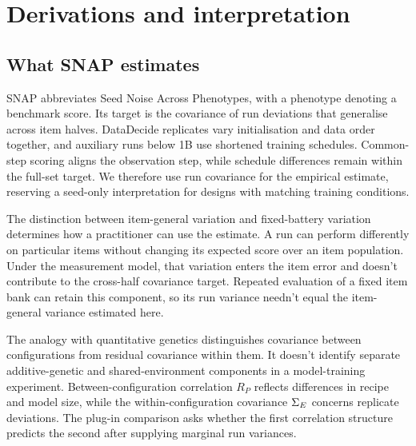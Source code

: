 \section{Derivations and interpretation}
\label{app:derivations}
\subsection{What SNAP estimates}
SNAP abbreviates Seed Noise Across Phenotypes, with a phenotype denoting a benchmark score. Its target is the covariance of run deviations that generalise across item halves. DataDecide replicates vary initialisation and data order together, and auxiliary runs below 1B use shortened training schedules. Common-step scoring aligns the observation step, while schedule differences remain within the full-set target. We therefore use run covariance for the empirical estimate, reserving a seed-only interpretation for designs with matching training conditions.

The distinction between item-general variation and fixed-battery variation determines how a practitioner can use the estimate. A run can perform differently on particular items without changing its expected score over an item population. Under the measurement model, that variation enters the item error and doesn't contribute to the cross-half covariance target. Repeated evaluation of a fixed item bank can retain this component, so its run variance needn't equal the item-general variance estimated here.

The analogy with quantitative genetics distinguishes covariance between configurations from residual covariance within them. It doesn't identify separate additive-genetic and shared-environment components in a model-training experiment. Between-configuration correlation $R_P$ reflects differences in recipe and model size, while the within-configuration covariance $\Sigma_E$ concerns replicate deviations. The plug-in comparison asks whether the first correlation structure predicts the second after supplying marginal run variances.

